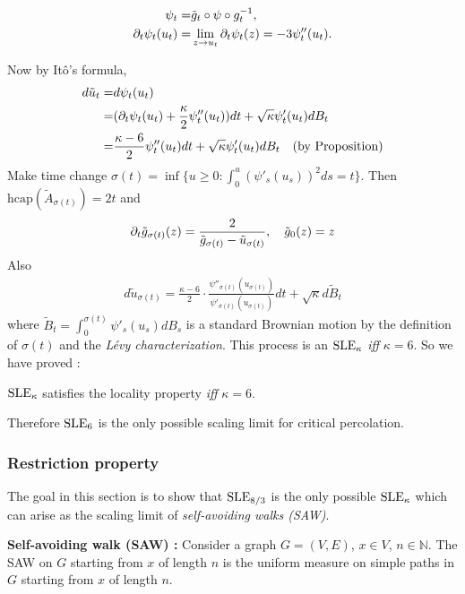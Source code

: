 \documentclass[12pt,a4paper]{article}
\begin{document}
\prop \begin{align*}
\psi_t =& \tilde{g}_t \circ \psi \circ g_t^{-1}, \\
\partial_t \psi_t (u_t) =& \lim_{z\rightarrow u_t} \partial_t \psi_t(z) =-3\psi_t''(u_t).
\end{align*}
\s

Now by It\^o's formula,
\begin{align*}
d\tilde{u}_t =& d\psi_t(u_t) \\
=& (\partial_t \psi_t(u_t) + \frac{\kappa}{2} \psi''_t(u_t))dt + \sqrt{\kappa} \psi'_t(u_t) dB_t \\
=& \frac{\kappa - 6}{2} \psi''_t (u_t) dt + \sqrt{\kappa} \psi'_t(u_t) dB_t \quad \text{(by Proposition)}
\end{align*}
Make time change $\sigma(t) = \inf \{u\geq 0 : \int_0^u (\psi'_s(u_s))^2 ds =t \}$. Then $\text{hcap}(\tilde{A}_{\sigma(t)}) = 2t$ and
\begin{align*}
\partial_t \tilde{g}_{\sigma(t)}(z)  = \frac{2}{\tilde{g}_{\sigma(t)} - \tilde{u}_{\sigma(t)} }, \quad \tilde{g}_0(z) =z
\end{align*}
Also
\begin{align*}
d\tilde{u}_{\sigma(t)} = \frac{\kappa -6}{2} \cdot \frac{\psi''_{\sigma(t)}(u_{\sigma(t)})}{\psi'_{\sigma(t)}(u_{\sigma(t)})} dt + \sqrt{\kappa} d\tilde{B}_t
\end{align*}
where $\tilde{B}_t = \int_0^{\sigma(t)} \psi'_s(u_s)dB_s$ is a standard Brownian motion by the definition of $\sigma(t)$ and the \emph{L\'evy characterization}. This process is an $\text{SLE}_{\kappa}$ \emph{iff} $\kappa =6$. So we have proved :
\s

\thm $\text{SLE}_{\kappa}$ satisfies the locality property \emph{iff} $\kappa =6$.
\s

Therefore $\text{SLE}_{6}$ is the only possible scaling limit for critical percolation. 
\s

\subsubsection*{Restriction property}

The goal in this section is to show that $\text{SLE}_{8/3}$ is the only possible $\text{SLE}_{\kappa}$ which can arise as the scaling limit of \emph{self-avoiding walks (SAW)}.
\s

\textbf{Self-avoiding walk (SAW) :} Consider a graph $G =(V,E)$, $x \in V$, $n\in\mathbb{N}$. The SAW on $G$ starting from $x$ of length $n$ is the uniform measure on simple paths in $G$ starting from $x$ of length $n$.
\end{document}

